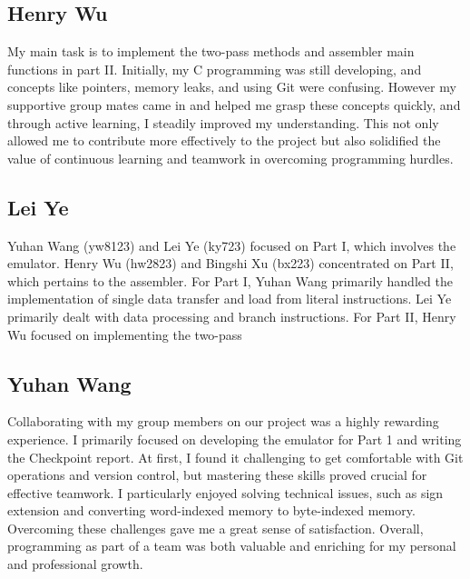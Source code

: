 \documentclass[11pt]{article}
\begin{document}
\subsection{Henry Wu}

My main task is to implement the two-pass methods and assembler main functions in part II. 
Initially, my C programming was still developing, and concepts like pointers, memory leaks, 
and using Git were confusing. However my supportive group mates came in and helped me grasp 
these concepts quickly, and through active learning, I steadily improved my understanding. 
This not only allowed me to contribute more effectively to the project but also 
solidified the value of continuous learning and teamwork in overcoming programming hurdles.

\subsection{Lei Ye}

Yuhan Wang (yw8123) and Lei Ye (ky723) focused on Part I, which involves the emulator. Henry Wu (hw2823) and Bingshi Xu (bx223) concentrated on Part II, which pertains to the assembler.
For Part I, Yuhan Wang primarily handled the implementation of single data transfer and load from literal instructions. Lei Ye primarily dealt with data processing and branch instructions.
For Part II, Henry Wu focused on implementing the two-pass 

\subsection{Yuhan Wang}
Collaborating with my group members on our project was a highly rewarding 
experience. I primarily focused on developing the emulator for Part 1 and 
writing the Checkpoint report. At first, I found it challenging to get 
comfortable with Git operations and version control, but mastering these 
skills proved crucial for effective teamwork. I particularly enjoyed solving 
technical issues, such as sign extension and converting word-indexed memory 
to byte-indexed memory. Overcoming these challenges gave me a great sense of 
satisfaction. Overall, programming as part of a team was both valuable and 
enriching for my personal and professional growth.
\end{document}
